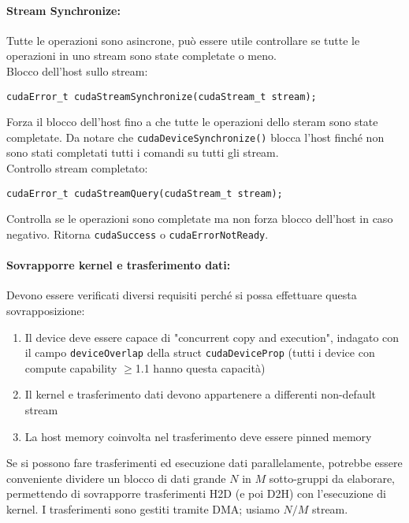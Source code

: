 \paragraph{Stream Synchronize:} Tutte le operazioni sono asincrone, può essere utile controllare se tutte le operazioni in uno stream sono state completate o meno.\\

Blocco dell'host sullo stream: 
\begin{verbatim}
cudaError_t cudaStreamSynchronize(cudaStream_t stream);
\end{verbatim}
Forza il blocco dell'host fino a che tutte le operazioni dello steram sono state completate. Da notare che \texttt{cudaDeviceSynchronize()} blocca l'host finché non sono stati completati tutti i comandi su tutti gli stream.\\

Controllo stream completato:
\begin{verbatim}
cudaError_t cudaStreamQuery(cudaStream_t stream);
\end{verbatim}
Controlla se le operazioni sono completate ma non forza blocco dell'host in caso negativo. Ritorna \texttt{cudaSuccess} o \texttt{cudaErrorNotReady}.\\

\newpage

\paragraph{Sovrapporre kernel e trasferimento dati:} Devono essere verificati diversi requisiti perché si possa effettuare questa sovrapposizione:
\begin{enumerate}
	\item Il device deve essere capace di "concurrent copy and execution", indagato con il campo \texttt{deviceOverlap} della struct \texttt{cudaDeviceProp} (tutti i device con compute capability $\geq$1.1 hanno questa capacità)
	\item Il kernel e trasferimento dati devono appartenere a differenti non-default stream
	\item La host memory coinvolta nel trasferimento deve essere pinned memory
\end{enumerate}

Se si possono fare trasferimenti ed esecuzione dati parallelamente, potrebbe essere conveniente dividere un blocco di dati grande $N$ in $M$ sotto-gruppi da elaborare, permettendo di sovrapporre trasferimenti H2D (e poi D2H) con l'esecuzione di kernel. I trasferimenti sono gestiti tramite DMA; usiamo $N/M$ stream.\\

